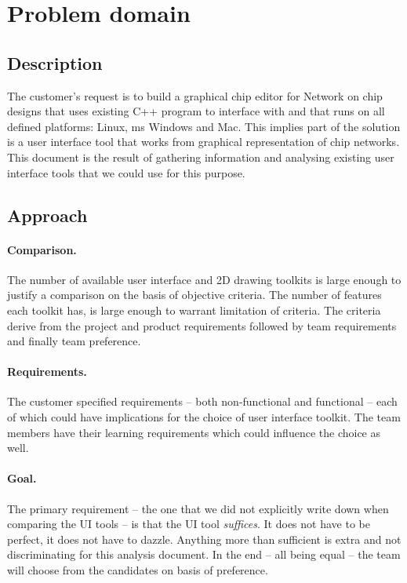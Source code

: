 \section{Problem domain}
\subsection{Description}

The customer's request is to build a graphical chip editor for Network on chip
designs that uses existing C++ program to interface with and that runs on all
defined platforms: Linux, ms Windows and Mac. This implies part of the solution
is a user interface tool that works from graphical representation of chip
networks. This document is the result of gathering information and analysing
existing user interface tools that we could use for this purpose.

\subsection{Approach}

\paragraph{Comparison.} The number of available user interface and 2D drawing
toolkits is large enough to justify a comparison on the basis of objective
criteria. The number of features each toolkit has, is large enough to warrant
limitation of criteria. The criteria derive from the project and product
requirements followed by team requirements and finally team preference.

\paragraph{Requirements.} The customer specified requirements -- both
non-functional and functional -- each of which could have implications for the
choice of user interface toolkit. The team members have their learning
requirements which could influence the choice as well.

\paragraph{Goal.} The primary requirement -- the one that we did not explicitly
write down when comparing the UI tools -- is that the UI tool \emph{suffices}.
It does not have to be perfect, it does not have to dazzle.
Anything more than sufficient is extra and not discriminating for this analysis
document. In the end -- all being equal -- the team will choose from the
candidates on basis of preference.